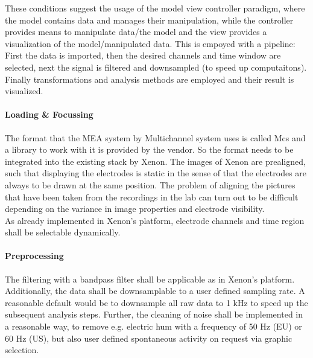 \documentclass[a4paper]{article}
\begin{document}
		These conditions suggest the usage of the model view controller paradigm, where the model contains data and manages their manipulation, while the controller provides means to manipulate data/the model and the view provides a visualization of the model/manipulated data. This is empoyed with a pipeline: First the data is imported, then the desired channels and time window are selected, next the signal is filtered and downsampled (to speed up computaitons). Finally transformations and analysis methods are employed and their result is visualized.
		
		\paragraph{Loading \& Focussing}
            The format that the MEA system by Multichannel system uses is called Mcs and a library to work with it is provided by the vendor. 
            So the format needs to be integrated into the existing stack by Xenon. 
            The images of Xenon are prealigned, such that displaying the electrodes is static in the sense of that the electrodes are always to be drawn at the same position. 
            The problem of aligning the pictures that have been taken from the recordings in the lab can turn out to be difficult depending on the variance in image properties and electrode visibility. \\
            As already implemented in Xenon's platform, electrode channels and time region shall be selectable dynamically.
				
		\paragraph{Preprocessing}
            The filtering with a bandpass filter shall be applicable as in Xenon's platform. 
            Additionally, the data shall be downsamplable to a user defined sampling rate.
            A reasonable default would be to downsample all raw data to 1 kHz to speed up the subsequent analysis steps.
            Further, the cleaning of noise shall be implemented in a reasonable way, to remove e.g. electric hum with a frequency of 50 Hz (EU) or 60 Hz (US), but also user defined spontaneous activity on request via graphic selection.
		
\end{document}
